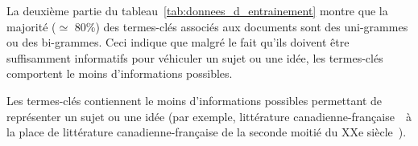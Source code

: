     La deuxième partie du tableau~\ref{tab:donnees_d_entrainement} montre que la
    majorité ($\simeq$ 80\%) des  termes-clés associés aux documents sont des
    uni-grammes ou des bi-grammes. Ceci indique que malgré le fait qu'ils
    doivent être suffisamment informatifs pour véhiculer un sujet ou une idée,
    les termes-clés comportent le moins d'informations possibles.

    \begin{property}
      Les termes-clés contiennent le moins d'informations possibles permettant
      de représenter un sujet ou une idée (par exemple, \og littérature
      canadienne-française~\fg\ à la place de \og littérature
      canadienne-française de la seconde moitié du XXe siècle~\fg).
      \label{prop:informativite}
    \end{property}

